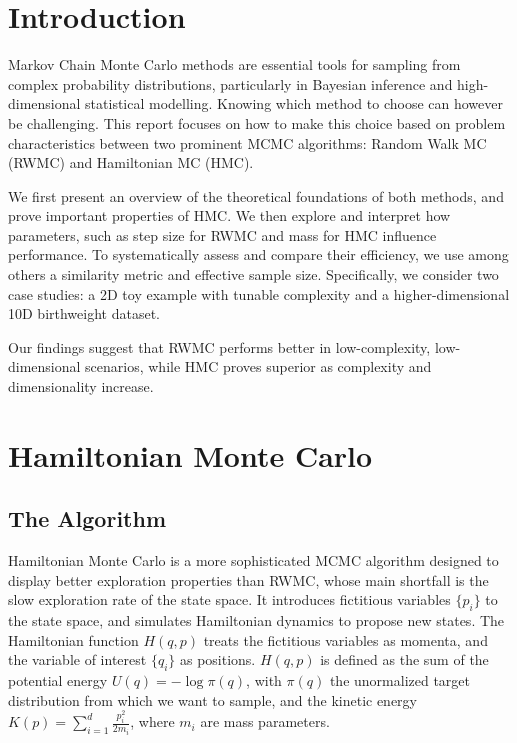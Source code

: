 \documentclass[a4paper, 12pt,oneside]{article}
\begin{document}
 
	 
	\clearpage
	\tableofcontents
	\thispagestyle{empty} 
	\clearpage
	\setcounter{page}{1}
	\section{Introduction}
	Markov Chain Monte Carlo methods are essential tools for sampling from complex probability distributions, particularly in Bayesian inference and high-dimensional statistical modelling. Knowing which method to choose can however be challenging. This report focuses on how to make this choice based on problem characteristics between two prominent MCMC algorithms: Random Walk MC (RWMC) and Hamiltonian MC (HMC). 
	
	We first present an overview of the theoretical foundations of both methods, and prove important properties of HMC.	
	We then explore and interpret how parameters, such as step size for RWMC and mass for HMC influence performance. To systematically assess and compare their efficiency, we use among others a similarity metric and effective sample size. 
	Specifically, we consider two case studies: a 2D toy example with tunable complexity and a higher-dimensional 10D birthweight dataset. 
	
	Our findings suggest that RWMC performs better in low-complexity, low-dimensional scenarios, while HMC proves superior as complexity and dimensionality increase.
	\section{Hamiltonian Monte Carlo}
		\subsection{The Algorithm}
		Hamiltonian Monte Carlo is a more sophisticated MCMC algorithm designed to display better exploration properties than RWMC, whose main shortfall is the slow exploration rate of the state space.
		It introduces fictitious variables $\{p_i\}$ to the state space, and simulates Hamiltonian dynamics to propose new states. The Hamiltonian function $H(q, p)$  treats the fictitious variables as momenta, and the variable of interest $\{q_i\}$ as positions.
		$H(q, p)$ is defined as the sum of the potential energy $U(q)= -\log \pi(q)$, with $\pi(q)$ the unormalized target distribution from which we want to sample, and the kinetic energy $K(p)=\sum_{i=1}^d \frac{p_i^2}{2 m_i}$, where $m_i$ are mass parameters.
\end{document}
